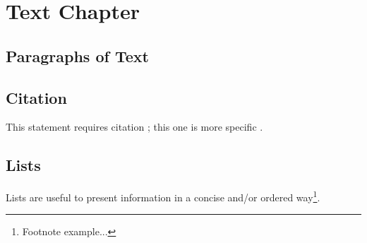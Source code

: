 \documentclass[11pt,fleqn]{book} %
\begin{document}



\pagestyle{empty} %

\tableofcontents %

\cleardoublepage %

\pagestyle{fancy} %



\chapter{Text Chapter}

\section{Paragraphs of Text}

\lipsum[1-7] %


\section{Citation}

This statement requires citation \cite{book_key}; this one is more specific \cite[122]{article_key}.


\section{Lists}

Lists are useful to present information in a concise and/or ordered way\footnote{Footnote example...}.
\end{document}
